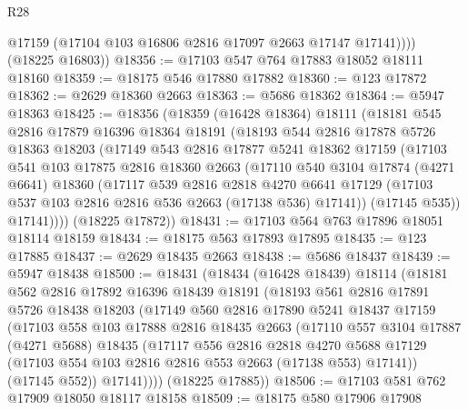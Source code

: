 \begin{lexlean}{R28}
\begin{coremodule}
            @17159
            (@17104 @103 @16806 @2816 @17097 @2663 @17147 @17141))))
      (@18225 @16803))
@18356 := @17103 @547 @764 @17883 @18052 @18111 @18160
@18359 := @18175 @546 @17880 @17882
@18360 := @123 @17872
@18362 := @2629 @18360 @2663
@18363 := @5686 @18362
@18364 := @5947 @18363
@18425 := @18356
    (@18359
      (@16428 @18364)
      @18111
      (@18181
        @545
        @2816
        @17879
        @16396
        @18364
        @18191
        (@18193
          @544
          @2816
          @17878
          @5726
          @18363
          @18203
          (@17149
            @543
            @2816
            @17877
            @5241
            @18362
            @17159
            (@17103
              @541
              @103
              @17875
              @2816
              @18360
              @2663
              (@17110
                @540
                @3104
                @17874
                (@4271 @6641)
                @18360
                (@17117
                  @539
                  @2816
                  @2818
                  @4270
                  @6641
                  @17129
                  (@17103 @537 @103 @2816 @2816 @536 @2663 (@17138 @536) @17141))
                (@17145 @535))
              @17141))))
      (@18225 @17872))
@18431 := @17103 @564 @763 @17896 @18051 @18114 @18159
@18434 := @18175 @563 @17893 @17895
@18435 := @123 @17885
@18437 := @2629 @18435 @2663
@18438 := @5686 @18437
@18439 := @5947 @18438
@18500 := @18431
    (@18434
      (@16428 @18439)
      @18114
      (@18181
        @562
        @2816
        @17892
        @16396
        @18439
        @18191
        (@18193
          @561
          @2816
          @17891
          @5726
          @18438
          @18203
          (@17149
            @560
            @2816
            @17890
            @5241
            @18437
            @17159
            (@17103
              @558
              @103
              @17888
              @2816
              @18435
              @2663
              (@17110
                @557
                @3104
                @17887
                (@4271 @5688)
                @18435
                (@17117
                  @556
                  @2816
                  @2818
                  @4270
                  @5688
                  @17129
                  (@17103 @554 @103 @2816 @2816 @553 @2663 (@17138 @553) @17141))
                (@17145 @552))
              @17141))))
      (@18225 @17885))
@18506 := @17103 @581 @762 @17909 @18050 @18117 @18158
@18509 := @18175 @580 @17906 @17908

\end{coremodule}
\end{lexlean}
